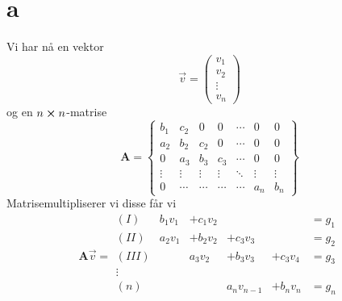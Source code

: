 \documentclass[english,notitlepage]{revtex4-1}  %
\begin{document}
\section*{a}
Vi har nå en vektor
$$
\vec{v}=\begin{pmatrix}
v_1 \\ v_2 \\ \vdots \\ v_n
\end{pmatrix}
$$
og en $n\cross n$-matrise
$$
\textbf{A}=\begin{Bmatrix}
b_1 & c_2 & 0 & 0 & \cdots & 0 &0 \\
a_2 & b_2 & c_2 & 0 & \cdots &0 &0 \\
0 & a_3 & b_3 & c_3 & \cdots & 0 &0 \\
\vdots & \vdots&\vdots&\vdots&\ddots & \vdots & \vdots\\
0& \cdots &  \cdots&\cdots&\cdots& a_n & b_n
\end{Bmatrix}
$$
Matrisemultipliserer vi disse får vi
$$
\textbf{A}\vec{v}=
\begin{matrix}
(I)&b_1 v_1 &+ c_1 v_2 & &&=g_1 \\
(II) &a_2 v_1&+b_2v_2&+c_3 v_3 &&=g_2\\
(III)& & a_3v_2 &+b_3v_3 &+ c_3 v_4 &=g_3\\
\vdots&&&&&\\
(n)&&&a_n v_{n-1}&+b_n v_n&=g_n\\

\end{matrix}
$$

\end{document}
